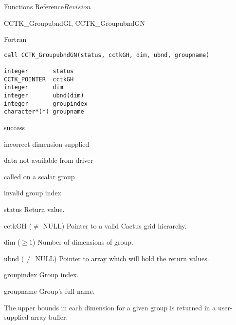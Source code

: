 \begin{cactuspart}{ Functions Reference}{}{$Revision$}
\begin{FunctionDescription}{CCTK\_GroupubndGI, CCTK\_GroupubndGN}
\begin{SynopsisSection}
\begin{Synopsis}{Fortran}
\begin{verbatim}
call CCTK_GroupubndGN(status, cctkGH, dim, ubnd, groupname)

integer       status
CCTK_POINTER  cctkGH
integer       dim
integer       ubnd(dim)
integer       groupindex
character*(*) groupname
\end{verbatim}
\end{Synopsis}
\end{SynopsisSection}

\begin{ResultSection}
\begin{Result}{0} success \end{Result}
\begin{Result}{-1} incorrect dimension supplied \end{Result}
\begin{Result}{-2} data not available from driver \end{Result}
\begin{Result}{-3} called on a scalar group \end{Result}
\begin{Result}{-4} invalid group index \end{Result}
\end{ResultSection}

\begin{ParameterSection}
\begin{Parameter}{status} Return value. \end{Parameter}
\begin{Parameter}{cctkGH ($\ne$ NULL)} Pointer to a valid Cactus grid hierarchy. \end{Parameter}
\begin{Parameter}{dim ($\ge 1$)} Number of dimensions of group. \end{Parameter}
\begin{Parameter}{ubnd ($\ne$ NULL)} Pointer to array which will hold the return values. \end{Parameter}
\begin{Parameter}{groupindex} Group index. \end{Parameter}
\begin{Parameter}{groupname} Group's full name. \end{Parameter}
\end{ParameterSection}

\begin{Discussion}
The upper bounds in each dimension for a given group is returned in a user-supplied array buffer.
\end{Discussion}


\end{FunctionDescription}
\end{cactuspart}

